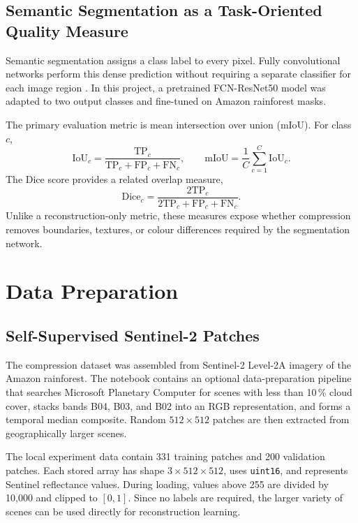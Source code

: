 \documentclass[10pt,a4paper]{article}
\begin{document}
\subsection{Semantic Segmentation as a Task-Oriented Quality Measure}

Semantic segmentation assigns a class label to every pixel. Fully
convolutional networks perform this dense prediction without requiring a
separate classifier for each image region \cite{long2015}. In this project, a
pretrained FCN-ResNet50 model was adapted to two output classes and fine-tuned
on Amazon rainforest masks.

The primary evaluation metric is mean intersection over union (mIoU). For
class \(c\),
\begin{equation}
    \mathrm{IoU}_c =
    \frac{\mathrm{TP}_c}
    {\mathrm{TP}_c+\mathrm{FP}_c+\mathrm{FN}_c},
    \qquad
    \mathrm{mIoU} = \frac{1}{C}\sum_{c=1}^{C}\mathrm{IoU}_c.
\end{equation}
The Dice score provides a related overlap measure,
\begin{equation}
    \mathrm{Dice}_c =
    \frac{2\mathrm{TP}_c}
    {2\mathrm{TP}_c+\mathrm{FP}_c+\mathrm{FN}_c}.
\end{equation}
Unlike a reconstruction-only metric, these measures expose whether compression
removes boundaries, textures, or colour differences required by the
segmentation network.

\section{Data Preparation}

\subsection{Self-Supervised Sentinel-2 Patches}

The compression dataset was assembled from Sentinel-2 Level-2A imagery of the
Amazon rainforest. The notebook contains an optional data-preparation pipeline
that searches Microsoft Planetary Computer for scenes with less than
10\,\% cloud cover, stacks bands B04, B03, and B02 into an RGB representation,
and forms a temporal median composite. Random \(512\times512\) patches are then
extracted from geographically larger scenes.

The local experiment data contain 331 training patches and 200 validation
patches. Each stored array has shape \(3\times512\times512\), uses
\texttt{uint16}, and represents Sentinel reflectance values. During loading,
values above 255 are divided by 10,000 and clipped to \([0,1]\). Since no
labels are required, the larger variety of scenes can be used directly for
reconstruction learning.
\end{document}
